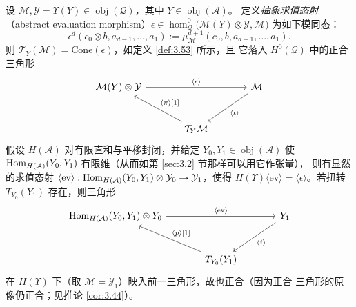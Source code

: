 \begin{Def}\label{def:4.21}
设 $\mathcal M,\mathcal Y=\Upsilon(Y)\in\operatorname{obj}(\mathcal Q)$，其中
$Y\in\operatorname{obj}(\mathcal A)$。
定义\emph{抽象求值态射}（abstract evaluation
morphism）$\epsilon\in\hom^0_{\mathcal Q}\bigl(\mathcal M(Y)\otimes\mathcal Y,\mathcal M\bigr)$
为如下模同态：
\[
  \epsilon^d(c_0\otimes b,a_{d-1},\dots,a_1)
  :=\mu^{d+1}_{\mathcal M}(c_0,b,a_{d-1},\dots,a_1).
\]
则 $\mathcal T_Y(\mathcal M)=\mathrm{Cone}(\epsilon)$，如定义 \ref{def:3.53} 所示，且
它落入 $H^0(\mathcal Q)$ 中的正合三角形
\[
  \begin{tikzcd}[row sep=large, column sep=large]
    \mathcal M(Y)\otimes\mathcal Y \arrow[rr, "{\langle\epsilon\rangle}"]
      & & \mathcal M \arrow[dl, "{\langle\iota\rangle}"] \\
    & \mathcal T_Y\mathcal M \arrow[ul, "{\langle\pi\rangle{[}1{]}}"'] &
  \end{tikzcd}
\]
假设 $H(\mathcal A)$ 对有限直和与平移封闭，并给定
$Y_0,Y_1\in\operatorname{obj}(\mathcal A)$ 使
$\operatorname{Hom}_{H(\mathcal A)}(Y_0,Y_1)$ 有限维（从而如第 \ref{sec:3.2} 节那样可以用它作张量），
则有显然的求值态射
$\langle\mathrm{ev}\rangle:\operatorname{Hom}_{H(\mathcal A)}(Y_0,Y_1)\otimes\mathcal Y_0
\to\mathcal Y_1$，使得
$H(\Upsilon)\langle\mathrm{ev}\rangle=\langle\epsilon\rangle$。若扭转
$T_{Y_0}(Y_1)$ 存在，则三角形
\[
  \begin{tikzcd}[row sep=large, column sep=large]
    \Hom_{H(\mathcal A)}(Y_0,Y_1)\otimes Y_0 \arrow[rr, "{\langle\mathrm{ev}\rangle}"]
      & & Y_1 \arrow[dl, "{\langle i\rangle}"] \\
    & T_{Y_0}(Y_1) \arrow[ul, "{\langle p\rangle{[}1{]}}"'] &
  \end{tikzcd}
\]
在 $H(\Upsilon)$ 下（取 $\mathcal M=\mathcal Y_1$）映入前一三角形，故也正合（因为正合
三角形的原像仍正合；见推论 \ref{cor:3.44}）。
\end{Def}

